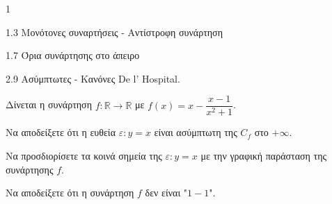 \begin{ylh}{1}
    \item 1.3 Μονότονες συναρτήσεις - Αντίστροφη συνάρτηση
    \item 1.7 Όρια συνάρτησης στο άπειρο
    \item 2.9 Ασύμπτωτες - Κανόνες De l’ Hospital.
\end{ylh}
Δίνεται η συνάρτηση $f: \mathbb{R} \to \mathbb{R}$ με $f(x)=x-\dfrac{x-1}{x^2+1}$.

\begin{alist}
\item Να αποδείξετε ότι η ευθεία $\varepsilon: y=x$ είναι ασύμπτωτη της $C_f$ στο $+\infty$. 
\item Να προσδιορίσετε τα κοινά σημεία της $\varepsilon: y=x$ με την γραφική παράσταση της συνάρτησης $f$. 
\item Να αποδείξετε ότι η συνάρτηση $f$ δεν είναι "$1-1$". 
\end{alist}